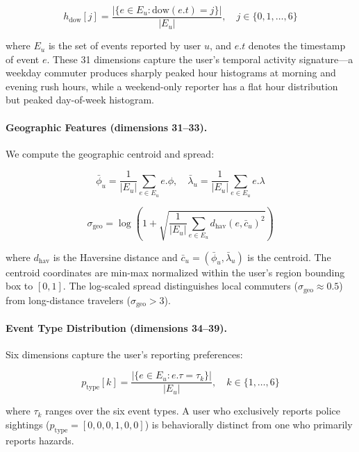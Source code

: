 \documentclass[11pt,a4paper]{article}
\begin{document}
\begin{equation}
\label{eq:dow_hist}
h_{\text{dow}}[j] = \frac{|\{e \in E_u : \text{dow}(e.t) = j\}|}{|E_u|}, \quad j \in \{0, 1, \ldots, 6\}
\end{equation}

where $E_u$ is the set of events reported by user $u$, and $e.t$ denotes the timestamp of event $e$. These 31 dimensions capture the user's temporal activity signature---a weekday commuter produces sharply peaked hour histograms at morning and evening rush hours, while a weekend-only reporter has a flat hour distribution but peaked day-of-week histogram.

\paragraph{Geographic Features (dimensions 31--33).}
We compute the geographic centroid and spread:

\begin{equation}
\label{eq:centroid}
\bar{\phi}_u = \frac{1}{|E_u|} \sum_{e \in E_u} e.\phi, \quad \bar{\lambda}_u = \frac{1}{|E_u|} \sum_{e \in E_u} e.\lambda
\end{equation}

\begin{equation}
\label{eq:spread}
\sigma_{\text{geo}} = \log\left(1 + \sqrt{\frac{1}{|E_u|} \sum_{e \in E_u} d_{\text{hav}}(e, \bar{c}_u)^2}\right)
\end{equation}

where $d_{\text{hav}}$ is the Haversine distance and $\bar{c}_u = (\bar{\phi}_u, \bar{\lambda}_u)$ is the centroid. The centroid coordinates are min-max normalized within the user's region bounding box to $[0, 1]$. The log-scaled spread distinguishes local commuters ($\sigma_{\text{geo}} \approx 0.5$) from long-distance travelers ($\sigma_{\text{geo}} > 3$).

\paragraph{Event Type Distribution (dimensions 34--39).}
Six dimensions capture the user's reporting preferences:

\begin{equation}
\label{eq:type_dist}
p_{\text{type}}[k] = \frac{|\{e \in E_u : e.\tau = \tau_k\}|}{|E_u|}, \quad k \in \{1, \ldots, 6\}
\end{equation}

where $\tau_k$ ranges over the six event types. A user who exclusively reports police sightings ($p_{\text{type}} = [0,0,0,1,0,0]$) is behaviorally distinct from one who primarily reports hazards.
\end{document}
